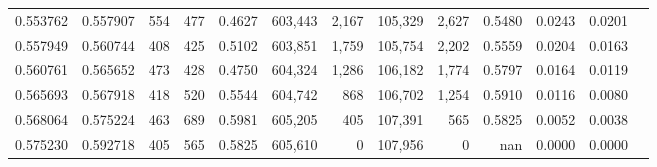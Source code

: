 \begin{tabular}{rrrrrrrrrrrrr}
0.553762 & 0.557907 &    554 &   477 &                                     0.4627 & 603,443 &   2,167 & 105,329 &   2,627 & 0.5480 & 0.0243 & 0.0201 \\
0.557949 & 0.560744 &    408 &   425 &                                     0.5102 & 603,851 &   1,759 & 105,754 &   2,202 & 0.5559 & 0.0204 & 0.0163 \\
0.560761 & 0.565652 &    473 &   428 &                                     0.4750 & 604,324 &   1,286 & 106,182 &   1,774 & 0.5797 & 0.0164 & 0.0119 \\
0.565693 & 0.567918 &    418 &   520 &                                     0.5544 & 604,742 &     868 & 106,702 &   1,254 & 0.5910 & 0.0116 & 0.0080 \\
0.568064 & 0.575224 &    463 &   689 &                                     0.5981 & 605,205 &     405 & 107,391 &     565 & 0.5825 & 0.0052 & 0.0038 \\
0.575230 & 0.592718 &    405 &   565 &                                     0.5825 & 605,610 &       0 & 107,956 &       0 &    nan & 0.0000 & 0.0000 \\
\bottomrule
\end{tabular}
